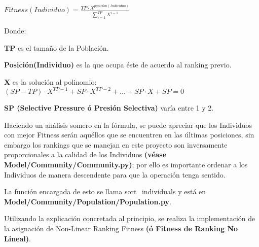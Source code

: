 \documentclass[letterpaper,10pt,english]{sphinxmanual}
\begin{document}
\begin{center}\(Fitness(Individuo) = \frac{TP \cdot X^{posici\acute{o}n(Individuo)}}{\sum_{i=1}^{TP}X^{i - 1}}\)
\end{center}
\begin{DUlineblock}{0em}
\item[] Donde:
\item[]
\begin{DUlineblock}{\DUlineblockindent}
\item[] \textbf{TP} es el tamaño de la Población.
\item[] \textbf{Posición(Individuo)} es la que ocupa éste de acuerdo al ranking previo.
\item[] \textbf{X} es la solución al polinomio: \((SP - TP) \cdot X^{TP - 1} + SP \cdot X^{TP - 2} + ... + SP \cdot X + SP = 0\)
\item[] \textbf{SP (Selective Pressure ó Presión Selectiva)} varía entre 1 y 2.
\item[] 
\end{DUlineblock}
\item[] Haciendo un análisis somero en la fórmula, se puede apreciar que los
Individuos con mejor Fitness serán aquéllos que se encuentren en las últimas posiciones,
sin embargo los rankings que se manejan en este proyecto son inversamente proporcionales
a la calidad de los Individuos \textbf{(véase Model/Community/Community.py)};
por ello es importante ordenar a los Individuos de manera descendente para que la operación tenga sentido.
\item[] La función encargada de esto se llama sort\_individuals y está en \textbf{Model/Community/Population/Population.py}.
\end{DUlineblock}
\label{Model/Fitness/NonLinearRankingFitness:module-Model.Fitness.NonLinearRankingFitness}

\begin{fulllineitems}
\label{Model/Fitness/NonLinearRankingFitness:Model.Fitness.NonLinearRankingFitness.assign_fitness}
Utilizando la explicación concretada al principio, se realiza
la implementación de la asignación de Non-Linear Ranking Fitness \textbf{(ó Fitness de Ranking No Lineal)}.

\end{fulllineitems}
\end{document}
